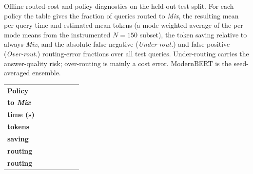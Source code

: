 \documentclass[english, bibtex]{kththesis}               %
\numberwithin{listing}{chapter}
\providecommand{\DIFaddtex}[1]{{\protect\color{blue} \sf #1}} %
\providecommand{\DIFdeltex}[1]{{\protect\color{red} \scriptsize #1}} %
\providecommand{\DIFaddFL}[1]{\DIFadd{#1}} %
\providecommand{\DIFdelFL}[1]{\DIFdel{#1}} %
\providecommand{\DIFaddbeginFL}{} %
\providecommand{\DIFdelbeginFL}{} %
\providecommand{\DIFdelendFL}{} %
\providecommand{\DIFadd}[1]{\texorpdfstring{\DIFaddtex{#1}}{#1}} %
\providecommand{\DIFdel}[1]{\texorpdfstring{\DIFdeltex{#1}}{}} %
\begin{document}
\begin{table}[!ht]
{%
\DIFdelFL{Offline routed-cost and policy diagnostics on the held-out test split. For each policy the table gives the fraction of queries routed to \emph{Mix}, the resulting mean per-query time and estimated mean tokens (a mode-weighted average of the per-mode means from the instrumented $N = 150$ subset), the token saving relative to always-\emph{Mix}, and the absolute false-negative (\emph{Under-rout.}) and false-positive (\emph{Over-rout.}) routing-error fractions over all test queries. Under-routing carries the answer-quality risk; over-routing is mainly a cost error. ModernBERT is the seed-averaged ensemble.}}
\DIFdelendFL \label{tab:routedCostResults}
\DIFdelbeginFL %
\DIFdelendFL \DIFaddbeginFL \begin{tabular}{l|cccccc}
\DIFaddFL{\textbf{Policy} }& \makecell{\textbf{Routed}\\\textbf{to \emph{Mix}}} & \makecell{\textbf{Mean}\\\textbf{time (s)}} & \makecell{\textbf{Mean}\\\textbf{tokens}} & \makecell{\textbf{Token}\\\textbf{saving}} & \makecell{\textbf{Under-}\\\textbf{routing}} & \makecell{\textbf{Over-}\\\textbf{routing}} \\

\end{tabular}
\end{table}
\end{document}
